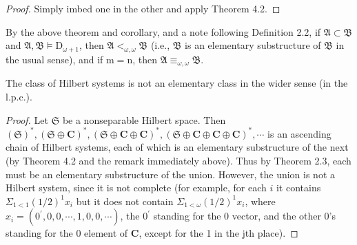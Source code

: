 \documentclass{article}
\begin{document}
{{{\begin{corollary}
\end{corollary}
\begin{proof}
Simply imbed one in the other and apply Theorem 4.2.
\end{proof}
By the above theorem and corollary, and a note following Definition 2.2, if $\mathfrak{A} \subset \mathfrak{B}$ and $\mathfrak{A}, \mathfrak{B} \vDash \mathrm{D}_{\omega+1}$, then $\mathfrak{A} <_{\omega, \omega} \mathfrak{B}$ (i.e., $\mathfrak{B}$ is an elementary substructure of $\mathfrak{B}$ in the usual sense), and if $\mathrm{m}=\mathrm{n}$, then $\mathfrak{A} \equiv_{\omega, \omega} \mathfrak{B}$.
\begin{theorem}
The class of Hilbert systems is not an elementary class in the wider sense (in the l.p.c.).
\end{theorem}
\begin{proof}
Let $\mathfrak{S}$ be a nonseparable Hilbert space. Then $(\mathfrak{S})^{*}, (\mathfrak{S} \oplus \mathbf{C})^{*}, (\mathfrak{S} \oplus \mathbf{C} \oplus \mathbf{C})^{*}, (\mathfrak{S} \oplus \mathbf{C} \oplus \mathbf{C} \oplus \mathbf{C})^{*}, \cdots$ is an ascending chain of Hilbert systems, each of which is an elementary substructure of the next (by Theorem 4.2 and the remark immediately above). Thus by Theorem 2.3, each must be an elementary substructure of the union. However, the union is not a Hilbert system, since it is not complete (for example, for each $i$ it contains $\Sigma_{1<1}(1 / 2)^{1} x_{i}$ but it does not contain $\Sigma_{1<\omega}(1 / 2)^{1} x_{i}$, where $x_{i}=\left(0^{\prime}, 0,0, \cdots, 1,0,0, \cdots\right)$, the $0^{\prime}$ standing for the 0 vector, and the other 0's standing for the 0 element of $\mathbf{C}$, except for the 1 in the jth place).
\end{proof}
}}}
\end{document}
